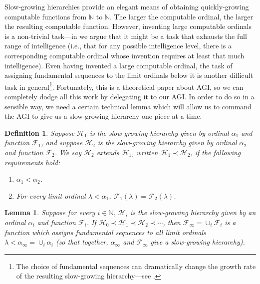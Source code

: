 \documentclass{article}
\newtheorem{definition}{Definition}
\newtheorem{lemma}[theorem]{Lemma}
\begin{document}
Slow-growing hierarchies provide an elegant means of obtaining quickly-growing
computable functions from $\mathbb N$ to $\mathbb N$.
The larger the computable ordinal, the larger the resulting computable function.
However, inventing large computable ordinals is a non-trivial task---in
\cite{ioi2} we argue that it might be a task that exhausts the full range
of intelligence (i.e., that for any possible intelligence level, there is a corresponding
computable ordinal whose invention requires at least that much intelligence).
Even having invented a large computable ordinal, the task of assigning fundamental
sequences to the limit ordinals below it is another difficult task in general\footnote{The
choice of fundamental sequences can dramatically change the growth rate of the
resulting slow-growing hierarchy---see \cite{weiermann1997sometimes}.}.
Fortunately, this is a theoretical paper about AGI, so we can completely dodge all this
work by delegating it to our AGI. In order to do so in a sensible way, we need a certain
technical lemma which will allow us to command the AGI to give us a slow-growing hierarchy
one piece at a time.

\begin{definition}
\label{fundamentalsequenceextensiondef}
    Suppose $\mathcal H_1$ is the slow-growing hierarchy given by
    ordinal $\alpha_1$ and function $\mathcal F_1$, and suppose
    $\mathcal H_2$ is the slow-growing hierarchy given by
    ordinal $\alpha_2$ and function $\mathcal F_2$.
    We say \emph{$\mathcal H_2$ extends $\mathcal H_1$},
    written $\mathcal H_1\prec \mathcal H_2$, if the following
    requirements hold:
    \begin{enumerate}
        \item
        $\alpha_1<\alpha_2$.
        \item
        For every limit ordinal $\lambda<\alpha_1$,
        $\mathcal F_1(\lambda)=\mathcal F_2(\lambda)$.
    \end{enumerate}
\end{definition}

\begin{lemma}
\label{slowgrowingtechnicallemma}
    Suppose for every $i\in\mathbb N$,
    $\mathcal H_i$ is the slow-growing hierarchy given by an ordinal
    $\alpha_i$ and function $\mathcal F_i$.
    If $\mathcal H_0\prec \mathcal H_1\prec \mathcal H_2\prec\cdots$,
    then
    $\mathcal F_\infty=\cup_i\mathcal F_i$ is a function which assigns
    fundamental sequences
    to all limit ordinals $\lambda<\alpha_\infty=\cup_i\alpha_i$
    (so that together, $\alpha_\infty$ and $\mathcal F_\infty$
    give a slow-growing hierarchy).
\end{lemma}
\end{document}
